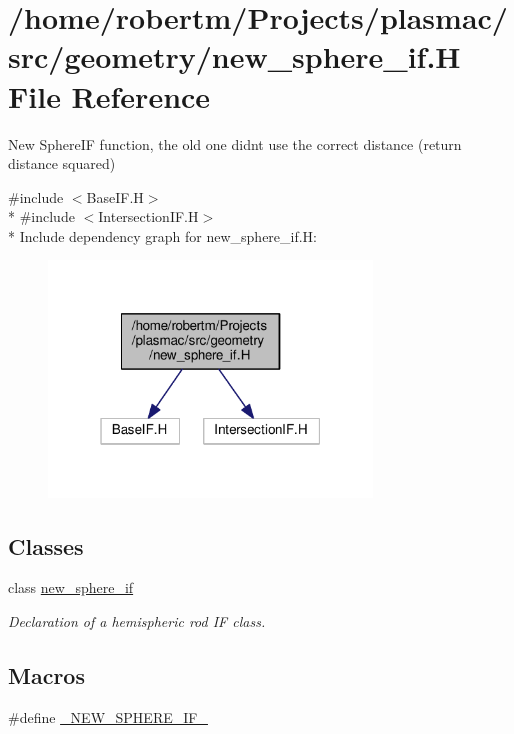 \hypertarget{new__sphere__if_8H}{}\section{/home/robertm/\+Projects/plasmac/src/geometry/new\+\_\+sphere\+\_\+if.H File Reference}
\label{new__sphere__if_8H}


New Sphere\+IF function, the old one didn\textquotesingle{}t use the correct distance (return distance squared)  


{\ttfamily \#include $<$Base\+I\+F.\+H$>$}\\*
{\ttfamily \#include $<$Intersection\+I\+F.\+H$>$}\\*
Include dependency graph for new\+\_\+sphere\+\_\+if.\+H\+:\nopagebreak
\begin{figure}[H]
\begin{center}
\leavevmode
\includegraphics[width=244pt]{new__sphere__if_8H__incl}
\end{center}
\end{figure}
\subsection*{Classes}
\begin{DoxyCompactItemize}
\item 
class \hyperlink{classnew__sphere__if}{new\+\_\+sphere\+\_\+if}
\begin{DoxyCompactList}\small\item\em Declaration of a hemispheric rod IF class. \end{DoxyCompactList}\end{DoxyCompactItemize}
\subsection*{Macros}
\begin{DoxyCompactItemize}
\item 
\#define \hyperlink{new__sphere__if_8H_ac7a24fb7b28f7a2bbe5441566aa607f0}{\+\_\+\+N\+E\+W\+\_\+\+S\+P\+H\+E\+R\+E\+\_\+\+I\+F\+\_\+}
\end{DoxyCompactItemize}


